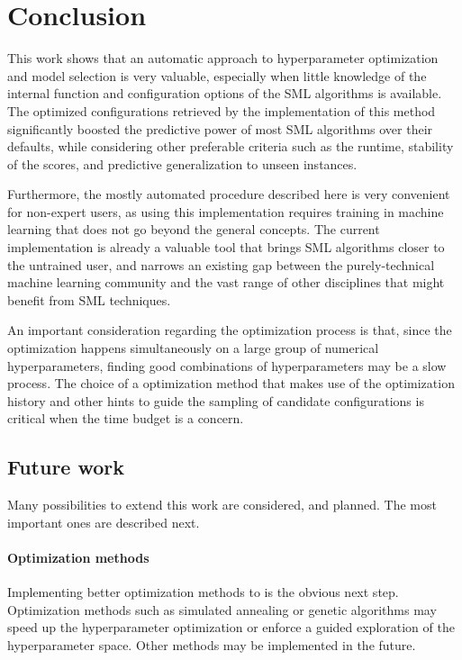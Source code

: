 \chapter{Conclusion}

This work shows that an automatic approach to hyperparameter optimization and model selection is
very valuable, especially when little knowledge of the internal function and configuration options of
the SML algorithms is
available. The optimized configurations retrieved by the implementation of this method significantly
boosted the predictive power of most SML algorithms over their defaults, while considering other
preferable criteria such as the runtime, stability of the scores, and predictive generalization to unseen
instances.

Furthermore, the mostly automated procedure described here is very convenient for non-expert users,
as using this implementation requires training in machine learning that does not go
beyond the general concepts. The current implementation is already a valuable tool that brings SML
algorithms closer to the untrained user, and narrows an existing gap between the purely-technical
machine learning community and the vast range of other disciplines that might benefit from SML
techniques.

An important consideration regarding the optimization process is that, since the optimization
happens simultaneously on a large group of numerical hyperparameters, finding good combinations of
hyperparameters may be a slow process. The choice of a optimization method that makes use of the
optimization history and other hints to guide the sampling of candidate configurations is critical
when the time budget is a concern.

\section{Future work}
	Many possibilities to extend this work are considered, and planned. The most important ones are
	described next.

	\subsubsection{Optimization methods}
	Implementing better optimization methods to is the obvious next step. Optimization methods such
	as simulated annealing or genetic algorithms may speed up the hyperparameter optimization or
	enforce a guided exploration of the hyperparameter space. Other methods may be implemented in
	the future.

